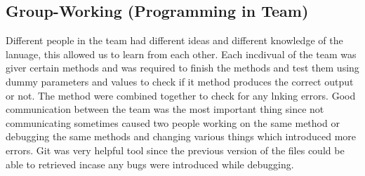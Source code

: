 \documentclass[12pt,a4paper,oneside]{report}
\begin{document}
\begin{center}
\section*{Group-Working (Programming in Team)}
\end{center}
Different people in the team had different ideas and different knowledge of the lanuage, this allowed us to learn from each other. Each incdivual of the team was giver certain methods and was required to finish  the methods and test them using dummy parameters and values to check if it method produces the correct output or not. The method were combined together to check for any lnking errors. Good communication between the team was the most important thing since not communicating sometimes caused two people working on the same method or debugging the same methods and changing various things which introduced more errors. Git was very helpful tool since the previous version of the files could be able to retrieved incase any bugs were introduced while debugging. 
\end{document}
